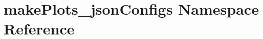 \hypertarget{namespacemakePlots__jsonConfigs}{
\section{makePlots\_\-jsonConfigs Namespace Reference}
\label{namespacemakePlots__jsonConfigs}
}
